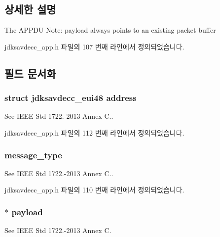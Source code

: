 \subsection{상세한 설명}
The A\+P\+P\+DU Note\+: payload always points to an existing packet buffer 

jdksavdecc\+\_\+app.\+h 파일의 107 번째 라인에서 정의되었습니다.



\subsection{필드 문서화}
\subsubsection[{\texorpdfstring{address}{address}}]{\setlength{\rightskip}{0pt plus 5cm}struct {\bf jdksavdecc\+\_\+eui48} address}\hypertarget{structjdksavdecc__appdu_a58564d10e6bb944368888630d011b003}{}\label{structjdksavdecc__appdu_a58564d10e6bb944368888630d011b003}
See I\+E\+EE Std 1722.-\/2013 Annex C.. 

jdksavdecc\+\_\+app.\+h 파일의 112 번째 라인에서 정의되었습니다.

\subsubsection[{\texorpdfstring{message\+\_\+type}{message_type}}]{ message\+\_\+type}\hypertarget{structjdksavdecc__appdu_aeaaffeace8c23899e558022f62ce6de4}{}\label{structjdksavdecc__appdu_aeaaffeace8c23899e558022f62ce6de4}
See I\+E\+EE Std 1722.-\/2013 Annex C.. 

jdksavdecc\+\_\+app.\+h 파일의 110 번째 라인에서 정의되었습니다.

\subsubsection[{\texorpdfstring{payload}{payload}}]{$\ast$ payload}\hypertarget{structjdksavdecc__appdu_aa5cbdad2c57e9b3f949e1a4d96382b66}{}\label{structjdksavdecc__appdu_aa5cbdad2c57e9b3f949e1a4d96382b66}
See I\+E\+EE Std 1722.-\/2013 Annex C. 

